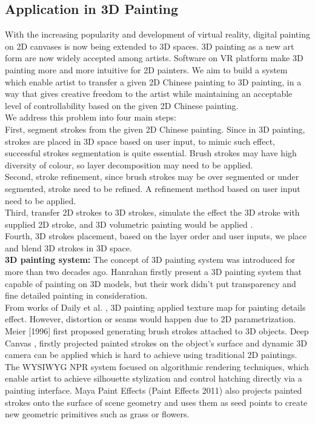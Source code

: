 \subsection{Application in 3D Painting}
With the increasing popularity and development of virtual reality, digital painting on 2D canvases is now being extended to 3D spaces. 3D painting as a new art form are now widely accepted among artists. Software on VR platform make 3D painting more and more intuitive for 2D painters.   
We aim to build a system which enable artist to transfer a given 2D Chinese painting to 3D  painting, in a way that gives creative freedom to the artist while maintaining an acceptable level of controllability based on the given 2D Chinese painting.\\
We address this problem into four main steps: \\
First, segment strokes from the given 2D Chinese painting. Since in 3D painting, strokes are placed in 3D space based on user input, to mimic such effect, successful strokes segmentation is quite essential. Brush strokes may have high diversity of colour, so layer decomposition may need to be applied. \\
Second, stroke refinement, since brush strokes may be over segmented or under segmented, stroke need to be refined. A refinement method based on user input need to be applied. \\
Third, transfer 2D strokes to 3D strokes, simulate the effect the 3D stroke with supplied 2D stroke, and 3D volumetric painting would be applied \cite{kim2017canvox}. \\
Fourth, 3D strokes placement, based on the layer order and user inputs, we place and blend 3D strokes in 3D space. \\
\textbf{3D painting system:}\newline
The concept of 3D painting system was introduced for more than two decades ago.  Hanrahan \cite{hanrahan1990direct} firstly present a 3D painting system that capable of painting on 3D models, but their work didn’t put transparency and fine detailed painting in consideration. \\
From works of  Daily et al. \cite{daily19953d}, 3D painting applied texture map for painting details effect. However, distortion or seams would happen due to 2D parametrization. Meier [1996] first proposed generating brush strokes attached to 3D objects.  Deep Canvas \cite{katanics2003deep}, firstly projected painted strokes on the object’s surface and dynamic 3D camera can be applied which is hard to achieve using traditional 2D paintings. The WYSIWYG NPR system \cite{kalnins2002wysiwyg} focused on algorithmic rendering techniques, which enable artist to achieve silhouette stylization and control hatching directly via a painting interface. Maya Paint Effects (Paint Effects 2011) also projects painted strokes onto the surface of scene geometry and uses them as seed points to create new geometric primitives such as grass or flowers.

